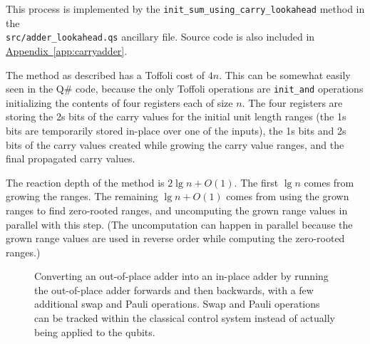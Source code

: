 \documentclass[onecolumn,unpublished]{quantumarticle}
\theoremstyle{definition}
\theoremstyle{definition}
\theoremstyle{definition}
\DeclareRobustCommand{\app}[1]{\hyperref[app:#1]{Appendix~\ref*{app:#1}}}
\begin{document}
This process is implemented by the \texttt{init\_sum\_using\_carry\_lookahead} method in the \\\texttt{src/adder\_lookahead.qs} ancillary file.
Source code is also included in \app{carryadder}.

The method as described has a Toffoli cost of $4n$.
This can be somewhat easily seen in the Q\# code, because the only Toffoli operations are \texttt{init\_and} operations initializing the contents of four registers each of size $n$.
The four registers are storing the 2s bits of the carry values for the initial unit length ranges (the 1s bits are temporarily stored in-place over one of the inputs), the 1s bits and 2s bits of the carry values created while growing the carry value ranges, and the final propagated carry values.

The reaction depth of the method is $2 \lg n  + O(1)$.
The first $\lg n$ comes from growing the ranges.
The remaining $\lg n + O(1)$ comes from using the grown ranges to find zero-rooted ranges, and uncomputing the grown range values in parallel with this step.
(The uncomputation can happen in parallel because the grown range values are used in reverse order while computing the zero-rooted ranges.)

\begin{figure}
\centering
{}
    \caption{
        Converting an out-of-place adder into an in-place adder by running the out-of-place adder forwards and then backwards, with a few additional swap and Pauli operations.
        Swap and Pauli operations can be tracked within the classical control system instead of actually being applied to the qubits.
    }
    \label{fig:oop2ip}
\end{figure}
\end{document}
